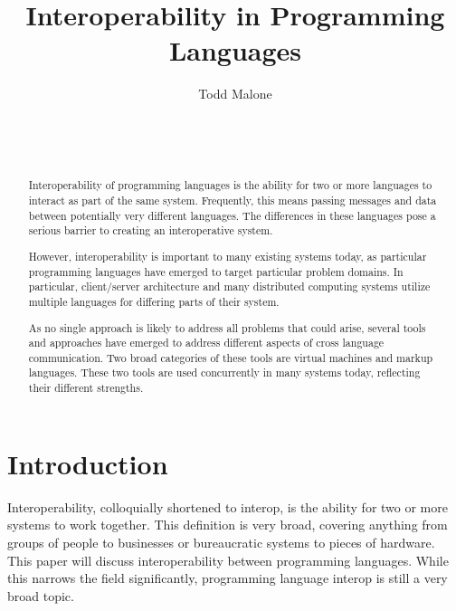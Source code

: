 \documentclass{sig-alternate}
\begin{document}

\title{Interoperability in Programming Languages}


\author{
\alignauthor
Todd Malone\\
	\\
	\\
	\\
}

\maketitle
\begin{abstract}
Interoperability of programming languages is the ability for two or more languages to interact as part of the same system. Frequently, this means passing messages and data between potentially very different languages.
The differences in these languages pose a serious barrier to creating an interoperative system.

However, interoperability is important to many existing systems today, as particular programming languages have emerged to target particular problem domains. In particular, client/server architecture and many distributed computing systems utilize multiple languages for differing parts of their system.

As no single approach is likely to address all problems that could arise, several tools and approaches have emerged to address different aspects of cross language communication.
Two broad categories of these tools are virtual machines and markup languages. These two tools are used concurrently in many systems today, reflecting their different strengths.
\end{abstract}


\section{Introduction}
Interoperability, colloquially shortened to interop, is the ability for two or more systems to work together. This definition is very broad, covering anything from groups of people to businesses or bureaucratic systems to pieces of hardware. This paper will discuss interoperability between programming languages. While this narrows the field significantly, programming language interop is still a very broad topic.
\end{document}
